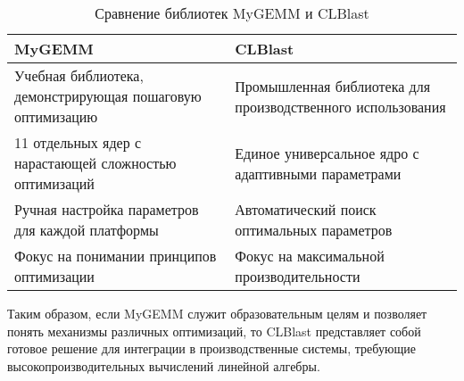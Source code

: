 \begin{table}[h]
\centering
\caption{Сравнение библиотек MyGEMM и CLBlast}
\label{tab:mygemm_vs_clblast}
\begin{tabular}{p{}p{}}
\hline
\textbf{MyGEMM} & \textbf{CLBlast} \\
\hline
Учебная библиотека, демонстрирующая пошаговую оптимизацию & Промышленная библиотека для производственного использования \\
\hline
11 отдельных ядер с нарастающей сложностью оптимизаций & Единое универсальное ядро с адаптивными параметрами \\
\hline
Ручная настройка параметров для каждой платформы & Автоматический поиск оптимальных параметров \\
\hline
Фокус на понимании принципов оптимизации & Фокус на максимальной производительности \\
\hline
\end{tabular}
\end{table}

Таким образом, если MyGEMM служит образовательным целям и позволяет понять механизмы различных оптимизаций, то CLBlast представляет собой готовое решение для интеграции в производственные системы, требующие высокопроизводительных вычислений линейной алгебры.